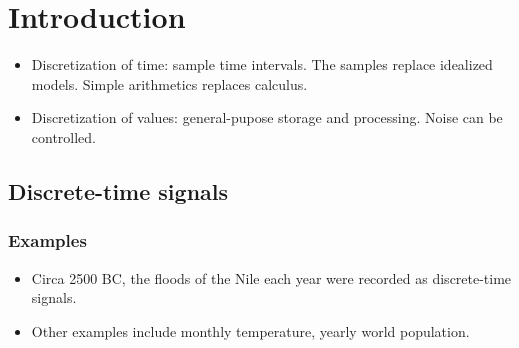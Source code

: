 \documentclass[../main.tex]{subfiles}
\begin{document}
\chapter{Introduction}
\begin{itemize}
    \item Discretization of time: sample time intervals. The samples replace idealized models. Simple arithmetics replaces calculus.
    \item Discretization of values: general-pupose storage and processing. Noise can be controlled.
\end{itemize}

\section{Discrete-time signals}
\subsection{Examples}
\begin{itemize}
    \item Circa 2500 BC, the floods of the Nile each year were recorded as discrete-time signals.
    \item Other examples include monthly temperature, yearly world population.
\end{itemize}
\end{document}
